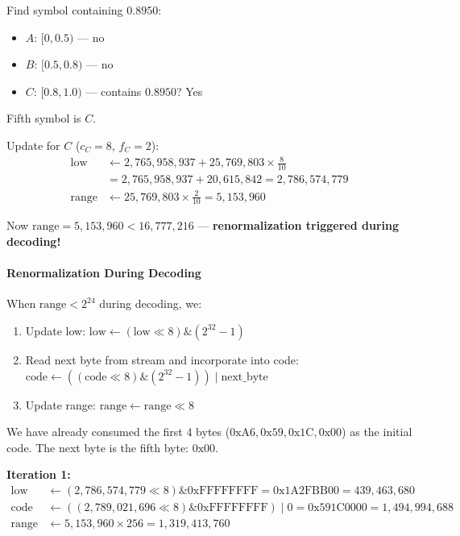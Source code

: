 Find symbol containing $0.8950$:
\begin{itemize}
    \item $A$: $[0, 0.5)$ — no
    \item $B$: $[0.5, 0.8)$ — no
    \item $C$: $[0.8, 1.0)$ — contains $0.8950$? Yes
\end{itemize}
Fifth symbol is $C$.

Update for $C$ ($c_C=8$, $f_C=2$):
\[
\begin{aligned}
\text{low} &\gets 2{,}765{,}958{,}937 + 25{,}769{,}803 \times \frac{8}{10} \\
&= 2{,}765{,}958{,}937 + 20{,}615{,}842 = 2{,}786{,}574{,}779 \\
\text{range} &\gets 25{,}769{,}803 \times \frac{2}{10} = 5{,}153{,}960
\end{aligned}
\]

Now $\text{range} = 5{,}153{,}960 < 16{,}777{,}216$ — \textbf{renormalization triggered during decoding!}

\paragraph{Renormalization During Decoding}

When $\text{range} < 2^{24}$ during decoding, we:
\begin{enumerate}
    \item Update low: $\text{low} \gets (\text{low} \ll 8) \mathrel{\&} (2^{32}-1)$
    \item Read next byte from stream and incorporate into code: $\text{code} \gets ((\text{code} \ll 8) \mathrel{\&} (2^{32}-1)) \mid \text{next\_byte}$
    \item Update range: $\text{range} \gets \text{range} \ll 8$
\end{enumerate}

We have already consumed the first 4 bytes ($\text{0xA6}, \text{0x59}, \text{0x1C}, \text{0x00}$) as the initial code. The next byte is the fifth byte: $\text{0x00}$.

\textbf{Iteration 1:}
\[
\begin{aligned}
\text{low} &\gets (2{,}786{,}574{,}779 \ll 8) \mathrel{\&} 0\text{xFFFFFFFF} = 0\text{x1A2FBB00} = 439{,}463{,}680 \\
\text{code} &\gets ((2{,}789{,}021{,}696 \ll 8) \mathrel{\&} 0\text{xFFFFFFFF}) \mid 0 = 0\text{x591C0000} = 1{,}494{,}994{,}688 \\
\text{range} &\gets 5{,}153{,}960 \times 256 = 1{,}319{,}413{,}760
\end{aligned}
\]

